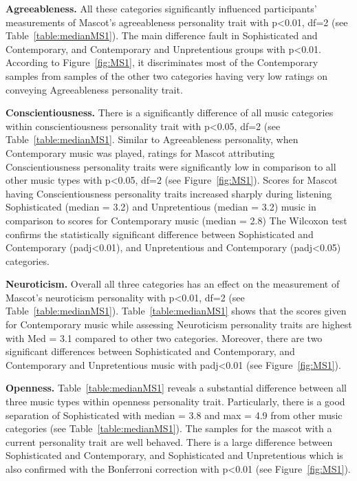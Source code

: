 \par\textbf{Agreeableness.}
All these categories significantly influenced participants' measurements of Mascot's
agreeableness personality trait with p<0.01, df=2 (see Table~\ref{table:medianMS1}).
The main difference fault in Sophisticated and Contemporary, and Contemporary
and Unpretentious groups with p<0.01.
According to Figure~\ref{fig:MS1}, it discriminates most of the Contemporary samples from
samples of the other two categories having very low ratings on conveying Agreeableness personality trait.

\par\textbf{Conscientiousness.}
There is a significantly difference of all music categories within conscientiousness
personality trait with p<0.05, df=2 (see Table~\ref{table:medianMS1}.
Similar to Agreeableness personality, when Contemporary music was played, ratings
for Mascot attributing Conscientiousness personality traits were significantly low
in comparison to all other music types with p<0.05, df=2 (see Figure~\ref{fig:MS1}).
Scores for Mascot having Conscientiousness personality traits increased sharply during listening Sophisticated
(median = 3.2) and Unpretentious (median = 3.2) music in comparison to scores for Contemporary music (median = 2.8)
The Wilcoxon test confirms the statistically significant difference between Sophisticated and Contemporary
(padj<0.01), and Unpretentious and Contemporary (padj<0.05) categories.

\par\textbf{Neuroticism.}
Overall all three categories has an effect on the measurement of Mascot's neuroticism
personality with p<0.01, df=2 (see Table~\ref{table:medianMS1}).
Table~\ref{table:medianMS1} shows that the scores given for Contemporary music while assessing
Neuroticism personality traits are highest with Med = 3.1 compared to other two categories.
Moreover, there are two significant differences between Sophisticated and Contemporary,
and Contemporary and Unpretentious music with padj<0.01 (see Figure~\ref{fig:MS1}).

\par\textbf{Openness.}
Table~\ref{table:medianMS1} reveals a substantial difference between all three music types
within openness personality trait.
Particularly, there is a good separation of Sophisticated with median = 3.8 and max = 4.9
from other music categories (see Table~\ref{table:medianMS1}).
The samples for the mascot with a current personality trait are well behaved.
There is a large difference between Sophisticated and Contemporary, and Sophisticated
and Unpretentious which is also confirmed with the Bonferroni correction with p<0.01 (see Figure~\ref{fig:MS1}).

